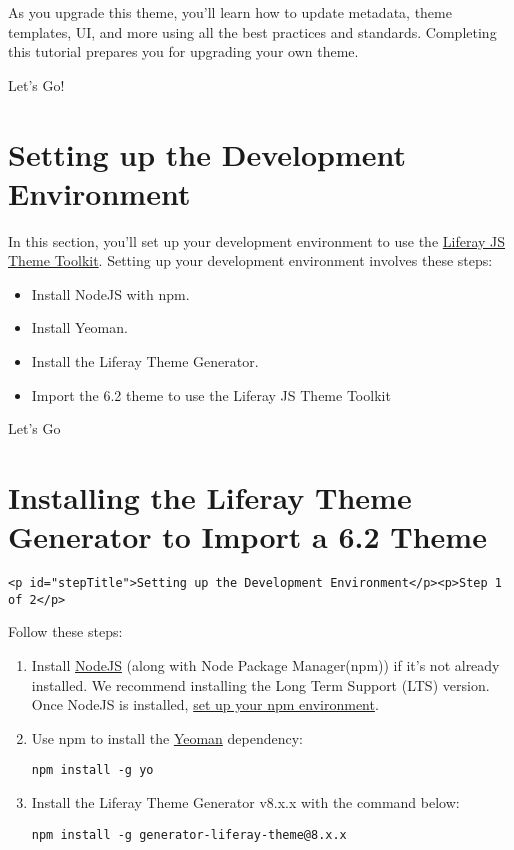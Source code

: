 As you upgrade this theme, you'll learn how to update metadata, theme
templates, UI, and more using all the best practices and standards.
Completing this tutorial prepares you for upgrading your own theme.

Let's Go!{}

\chapter{Setting up the Development
Environment}\label{setting-up-the-development-environment}

In this section, you'll set up your development environment to use the
\href{https://github.com/liferay/liferay-js-themes-toolkit/tree/master/packages}{Liferay
JS Theme Toolkit}. Setting up your development environment involves
these steps:

\begin{itemize}
\item
  Install NodeJS with npm.
\item
  Install Yeoman.
\item
  Install the Liferay Theme Generator.
\item
  Import the 6.2 theme to use the Liferay JS Theme Toolkit
\end{itemize}

Let's Go{}

\chapter{Installing the Liferay Theme Generator to Import a 6.2
Theme}\label{installing-the-liferay-theme-generator-to-import-a-6.2-theme}

\begin{verbatim}
<p id="stepTitle">Setting up the Development Environment</p><p>Step 1 of 2</p>
\end{verbatim}

Follow these steps:

\begin{enumerate}
\def\labelenumi{\arabic{enumi}.}
\item
  Install \href{http://nodejs.org/}{NodeJS} (along with Node Package
  Manager(npm)) if it's not already installed. We recommend installing
  the Long Term Support (LTS) version. Once NodeJS is installed,
  \href{/docs/7-2/reference/-/knowledge_base/r/setting-up-your-npm-environment}{set
  up your npm environment}.
\item
  Use npm to install the \href{http://yeoman.io/}{Yeoman} dependency:

\begin{verbatim}
npm install -g yo
\end{verbatim}
\item
  Install the Liferay Theme Generator v8.x.x with the command below:

\begin{verbatim}
npm install -g generator-liferay-theme@8.x.x
\end{verbatim}
\end{enumerate}

